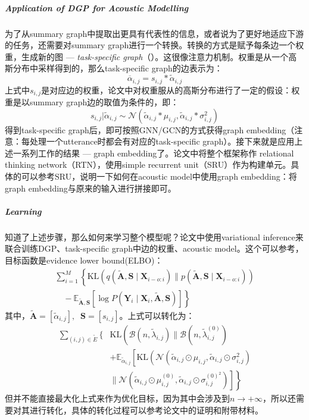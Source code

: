 \subparagraph{Application of DGP for Acoustic Modelling}
为了从summary graph中提取出更具有代表性的信息，或者说为了更好地适应下游的任务，还需要对summary graph进行一个转换。转换的方式是赋予每条边一个权重，生成新的图 --- \textit{task-specific graph}（）。这很像注意力机制。权重是从一个高斯分布中采样得到的，那么task-specific graph的边表示为：
$$
\overline{ \alpha}_{i,j} = s_{i,j} * \tilde{ \alpha}_{i,j}
$$
上式中$s_{i,j}$是对应边的权重，论文中对权重服从的高斯分布进行了一定的假设：权重是以summary graph边的取值为条件的，即：
$$
s_{i,j}|\tilde{ \alpha}_{i,j} \sim \mathcal{N}(\tilde{ \alpha}_{i,j} * \mu_{i,j}, \tilde{ \alpha}_{i,j} * \sigma_{i,j}^2)
$$
得到task-specific graph后，即可按照GNN/GCN的方式获得graph embedding（注意：每处理一个utterance时都会有对应的task-specific graph）。接下来就是应用上述一系列工作的结果 --- graph embedding了。论文中将整个框架称作 relational thinking network（RTN），使用simple recurrent unit（SRU）作为构建单元。具体的可以参考SRU，说明一下如何在acoustic model中使用graph embedding：将graph embedding与原来的输入进行拼接即可。

\subparagraph{Learning}
知道了上述步骤，那么如何来学习整个模型呢？论文中使用variational inference来联合训练DGP、task-specific graph中边的权重、acoustic model。这个可以参考\cite{kingma2014autoencoding}，目标函数是evidence lower bound(ELBO)：
\begin{equation}\nonumber
	\begin{array}{l}
		\sum_{i=1}^{M}\left\{\mathrm{KL}\left(q\left(\tilde{\mathbf{A}}, \mathbf{S} \mid \mathbf{X}_{i-o: i}\right) \| p\left(\tilde{\mathbf{A}}, \mathbf{S} \mid \mathbf{X}_{i-o: i}\right)\right)\right. \\
		\left.\quad-\mathbb{E}_{\tilde{\mathbf{A}}, \mathbf{S}}\left[\log P\left(\mathbf{Y}_{i} \mid \mathbf{X}_{i}, \tilde{\mathbf{A}}, \mathbf{S}\right)\right]\right\}
	\end{array}
\end{equation}
其中，$\tilde{\mathbf{A}} = [\tilde{ \alpha}_{i,j}],\;\; \mathbf{S} = [s_{i,j}]$。上式可以转化为：
\begin{equation}\nonumber
	\begin{aligned}
		\sum_{(i, j) \in \tilde{E}}\{& \mathrm{KL}\left(\mathcal{B}\left(n, \tilde{\lambda}_{i, j}\right) \| \mathcal{B}\left(n, \tilde{\lambda}_{i, j}^{(0)}\right)\right.\\
		&+\mathbb{E}_{\tilde{\alpha}_{i, j}}\left[\mathrm{KL}\left(\mathcal{N}\left(\tilde{\alpha}_{i, j} \odot \mu_{i, j}, \tilde{\alpha}_{i, j} \odot \sigma_{i, j}^{2}\right)\right.\right.\\
		&\left.\left.\| \mathcal{N}\left(\tilde{\alpha}_{i, j} \odot \mu_{i, j}^{(0)}, \tilde{\alpha}_{i, j} \odot \sigma_{i, j}^{(0)^{2}}\right)\right]\right\}
	\end{aligned}
\end{equation}
但并不能直接最大化上式来作为优化目标，因为其中会涉及到$n \rightarrow +\infty$，所以还需要对其进行转化，具体的转化过程可以参考论文中的证明和附带材料。

